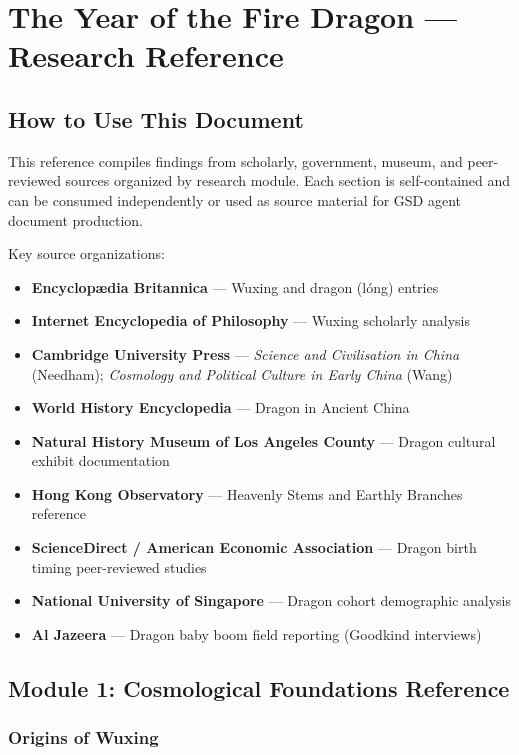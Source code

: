 \documentclass[11pt,letterpaper]{article}
\begin{document}
\section{The Year of the Fire Dragon --- Research Reference}

\subsection{How to Use This Document}

This reference compiles findings from scholarly, government, museum, and peer-reviewed sources organized by research module. Each section is self-contained and can be consumed independently or used as source material for GSD agent document production.

Key source organizations:
\begin{itemize}[leftmargin=2em]
\item \textbf{Encyclopædia Britannica} --- Wuxing and dragon (lóng) entries
\item \textbf{Internet Encyclopedia of Philosophy} --- Wuxing scholarly analysis
\item \textbf{Cambridge University Press} --- \emph{Science and Civilisation in China} (Needham); \emph{Cosmology and Political Culture in Early China} (Wang)
\item \textbf{World History Encyclopedia} --- Dragon in Ancient China
\item \textbf{Natural History Museum of Los Angeles County} --- Dragon cultural exhibit documentation
\item \textbf{Hong Kong Observatory} --- Heavenly Stems and Earthly Branches reference
\item \textbf{ScienceDirect / American Economic Association} --- Dragon birth timing peer-reviewed studies
\item \textbf{National University of Singapore} --- Dragon cohort demographic analysis
\item \textbf{Al Jazeera} --- Dragon baby boom field reporting (Goodkind interviews)
\end{itemize}

\subsection{Module 1: Cosmological Foundations Reference}

\subsubsection{Origins of Wuxing}
\end{document}
